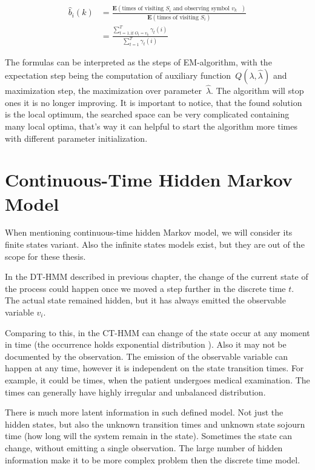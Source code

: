 \documentclass[thesis=M,english]{FITthesis}[2012/10/20]
\begin{document}
\begin{equation}\label{eq:bwb}
\begin{aligned}
\hat b_{i}(k) &= \frac{\mathbf{E}(\text{times of visiting $S_i$ and observing symbol $v_k$ })}
				   {\mathbf{E}(\text{times of visiting $S_i$})} \\
			  &= \frac{\sum\limits_{t=1, \text{if } O_t = v_k  }^{T} \gamma_t(i)}{\sum\limits_{t=1}^{T} \gamma_t(i) } 
\end{aligned}
\end{equation}

The formulas can be interpreted as the steps of EM-algorithm, with the expectation step being the computation of auxiliary function~$Q(\lambda,\hat\lambda)$ and maximization step, the maximization over parameter~$\hat\lambda$. The algorithm will stop ones it is no longer improving. It is important to notice, that the found solution is the local optimum, the searched space can be very complicated containing many local optima, that's way it can helpful to start the algorithm more times with different parameter initialization.  


\chapter{Continuous-Time Hidden Markov Model}

When mentioning continuous-time hidden Markov model, we will consider its finite states variant. Also the infinite states models exist, but they are out of the scope for these thesis.

In the DT-HMM described in previous chapter, the change of the current state of the process could happen once we moved a step further in the discrete time $t$. The actual state remained hidden, but it has always emitted the observable variable $v_i$.

Comparing to this, in the CT-HMM can change of the state occur at any moment in time (the occurrence holds exponential distribution ). Also it may not be documented by the observation. The emission of the observable variable can happen at any time, however it is independent on the state transition times. For example, it could be times, when the patient undergoes medical examination. The times can generally have highly irregular and unbalanced distribution.

There is much more latent information in such defined model. Not just the hidden states, but also the unknown transition times and unknown state sojourn time (how long will the system remain in the state).
Sometimes the state can change, without emitting a single observation. The large number of hidden information make it to be more complex problem then the discrete time model.
\end{document}
